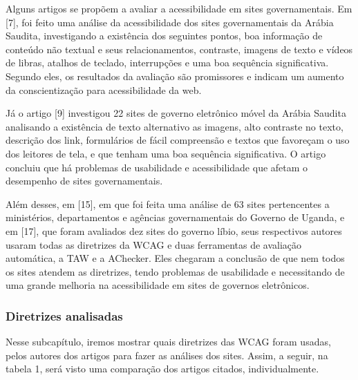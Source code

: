 \documentclass[a4paper]{article}
\begin{document}
\begin{titlepage}
Alguns artigos se propõem a avaliar a acessibilidade em sites governamentais. Em [7], foi feito uma análise da acessibilidade dos sites governamentais da Arábia Saudita, investigando a existência dos seguintes pontos, boa informação de conteúdo não textual e seus relacionamentos, contraste, imagens de texto e vídeos de libras, atalhos de teclado, interrupções e uma boa sequência significativa. Segundo eles, os resultados da avaliação são promissores e indicam um aumento da conscientização para acessibilidade da web.

Já o artigo [9] investigou 22 sites de governo eletrônico móvel da Arábia Saudita analisando a existência de texto alternativo as imagens, alto contraste no texto, descrição dos link, formulários de fácil compreensão e textos que favoreçam o uso dos leitores de tela, e que tenham uma boa sequência significativa. O artigo concluiu que há problemas de usabilidade e acessibilidade que afetam o desempenho de sites governamentais.

Além desses, em [15], em que foi feita uma análise de 63 sites pertencentes a ministérios, departamentos e agências governamentais do Governo de Uganda, e em [17], que foram avaliados dez sites do governo líbio, seus respectivos autores usaram todas as diretrizes da WCAG e duas ferramentas de avaliação automática, a TAW e a AChecker. Eles chegaram a conclusão de que nem todos os sites atendem as diretrizes, tendo problemas de usabilidade e necessitando de uma grande melhoria na acessibilidade em sites de governos eletrônicos.

\subsubsection{Diretrizes analisadas}

Nesse subcapítulo, iremos mostrar quais diretrizes das WCAG foram usadas, pelos autores dos artigos para fazer as análises dos sites. Assim, a seguir, na tabela 1, será visto uma comparação dos artigos citados, individualmente.\\


\end{titlepage}
\end{document}
